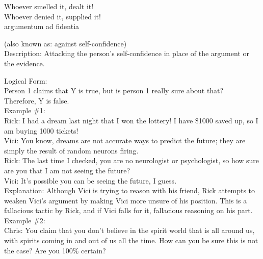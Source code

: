 \documentclass[a4paper,12pt,single,pdftex]{scrartcl}
\begin{document}
    
      Whoever smelled it, dealt it!
    \\

    
      Whoever denied it, supplied it!
    \\

  

argumentum ad fidentia
    
      (also known as: against self-confidence)
    \\

  
    Description: Attacking the person’s self-confidence in place of the argument or the evidence.

    
      Logical Form:
    \\

    
      Person 1 claims that Y is true, but is person 1 really sure about that?
    \\

    
      Therefore, Y is false.
    \\

    
      Example \#1:
    \\

    
      Rick: I had a dream last night that I won the lottery!  I have \$1000 saved up, so I am buying 1000 tickets!
    \\

    
      Vici: You know, dreams are not accurate ways to predict the future; they are simply the result of random neurons firing.
    \\

    
      Rick: The last time I checked, you are no neurologist or psychologist, so how sure are you that I am not seeing the future?
    \\

    
      Vici: It’s possible you can be seeing the future, I guess.
    \\

    
      Explanation: Although Vici is trying to reason with his friend, Rick attempts to weaken Vici’s argument by making Vici more unsure of his position.  This is a fallacious tactic by Rick, and if Vici falls for it, fallacious reasoning on his part.
    \\

    
      Example \#2:
    \\

    
      Chris: You claim that you don’t believe in the spirit world that is all around us, with spirits coming in and out of us all the time.  How can you be sure this is not the case?  Are you 100\% certain?
    \\
\end{document}
